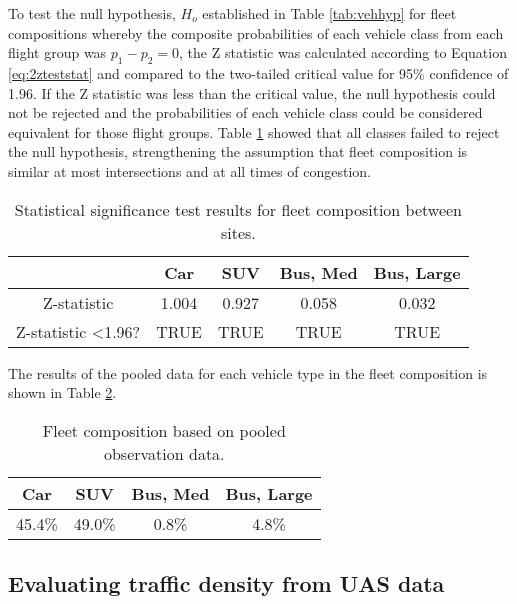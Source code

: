 To test the null hypothesis, $H_{o}$ established in Table \ref{tab:vehhyp} for fleet compositions whereby the composite probabilities of each vehicle class from each flight group was $p_{1} - p_{2} = 0$, the Z statistic was calculated according to Equation \ref{eq:2zteststat} and compared to the two-tailed critical value for 95\% confidence of 1.96. If the Z statistic was less than the critical value, the null hypothesis could not be rejected and the probabilities of each vehicle class could be considered equivalent for those flight groups. Table \ref{tab:fleettest} showed that all classes failed to reject the null hypothesis, strengthening the assumption that fleet composition is similar at most intersections and at all times of congestion.

\begin{table}[H]
\centering
\caption{Statistical significance test results for fleet composition between sites.}
\label{tab:fleettest}
\begin{tabular}{@{}ccccc@{}}
\toprule
\textbf{} & \textbf{Car} & \textbf{SUV} & \textbf{Bus, Med} & \textbf{Bus, Large} \\ \midrule
Z-statistic & 1.004 & 0.927 & 0.058 & 0.032 \\
Z-statistic \textless 1.96? & TRUE & TRUE & TRUE & TRUE \\ \bottomrule
\end{tabular}
\end{table}

The results of the pooled data for each vehicle type in the fleet composition is shown in Table \ref{tab:pooledfleet}.

\begin{table}[H]
\centering
\caption{Fleet composition based on pooled observation data.}
\label{tab:pooledfleet}
\begin{tabular}{cccc}
\toprule
\textbf{Car} & \textbf{SUV} & \textbf{Bus, Med} & \textbf{Bus, Large} \\ \midrule
45.4\% & 49.0\% & 0.8\% & 4.8\%\\ \bottomrule
\end{tabular}
\end{table}

\subsection{Evaluating traffic density from UAS data}

